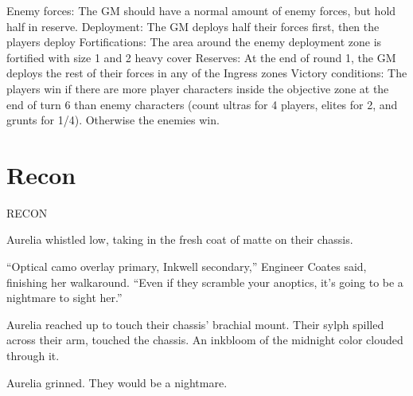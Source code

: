                                                              Enemy forces: The GM should have a  
                                                             normal amount of enemy forces, but hold half  
                                                             in reserve.  
                                                             Deployment: The GM deploys half their  
                                                            forces first, then the players deploy  
                                                             Fortifications: The area around the enemy  
                                                             deployment zone is fortified with size 1 and 2  
                                                             heavy cover  
                                                             Reserves: At the end of round 1, the GM  
                                                             deploys the rest of their forces in any of the  
                                                             Ingress zones  
                                                            Victory conditions: The players win if there  
                                                             are more player characters inside the  
                                                             objective zone at the end of turn 6 than enemy  
                                                            characters (count ultras for 4 players, elites for  
2, and grunts for 1/4). Otherwise the enemies win.  

                                                                                                                
\section{Recon}

RECON  

         Aurelia whistled low, taking in the fresh coat of matte on their chassis.   

          “Optical camo overlay primary, Inkwell secondary,” Engineer Coates said, finishing her walkaround.  
          “Even if they scramble your anoptics, it’s going to be a nightmare to sight her.”   

         Aurelia reached up to touch their chassis’ brachial mount. Their sylph spilled across their arm,  
         touched the chassis. An inkbloom of the midnight color clouded through it.  

         Aurelia grinned. They would be a nightmare.   

